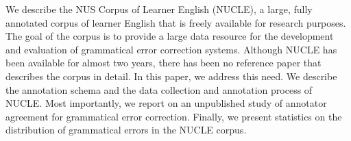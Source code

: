We describe the NUS Corpus of Learner English (NUCLE), a large,   fully annotated corpus of learner English that is freely available
   for research purposes. The goal of the corpus is to provide a large
   data resource for the development and evaluation of grammatical
   error correction systems. Although NUCLE has been available for
   almost two years, there has been no reference paper that describes
   the corpus in detail. In this paper, we address this need. We
   describe the annotation schema and the data collection and
   annotation process of NUCLE. Most importantly, we report on an
   unpublished study of annotator agreement for grammatical error
   correction. Finally, we present statistics on the distribution of
   grammatical errors in the NUCLE corpus.

